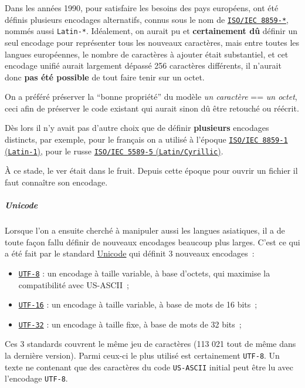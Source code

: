     Dans les années 1990, pour satisfaire les besoins des pays européens,
ont été définis plusieurs encodages alternatifs, connus sous le nom de
\href{http://en.wikipedia.org/wiki/ISO/IEC_8859}{\texttt{ISO/IEC\ 8859-*}},
nommés aussi \texttt{Latin-*}. Idéalement, on aurait pu et
\textbf{certainement dû} définir un seul encodage pour représenter tous
les nouveaux caractères, mais entre toutes les langues européennes, le
nombre de caractères à ajouter était substantiel, et cet encodage unifié
aurait largement dépassé 256 caractères différents, il n'aurait donc
\textbf{pas été possible} de tout faire tenir sur un octet.

On a préféré préserver la ``bonne propriété'' du modèle \emph{un
caractère} == \emph{un octet}, ceci afin de préserver le code existant
qui aurait sinon dû être retouché ou réécrit.

Dès lors il n'y avait pas d'autre choix que de définir
\textbf{plusieurs} encodages distincts, par exemple, pour le français on
a utilisé à l'époque
\href{http://en.wikipedia.org/wiki/ISO/IEC_8859-1}{\texttt{ISO/IEC\ 8859-1}
(\texttt{Latin-1})}, pour le russe
\href{http://en.wikipedia.org/wiki/ISO/IEC_8859-5}{\texttt{ISO/IEC\ 5589-5}
(\texttt{Latin/Cyrillic})}.

À ce stade, le ver était dans le fruit. Depuis cette époque pour ouvrir
un fichier il faut connaître son encodage.

    \hypertarget{unicode}{%
\subparagraph{Unicode}\label{unicode}}

    Lorsque l'on a ensuite cherché à manipuler aussi les langues asiatiques,
il a de toute façon fallu définir de nouveaux encodages beaucoup plus
larges. C'est ce qui a été fait par le standard
\href{http://en.wikipedia.org/wiki/Unicode}{Unicode} qui définit 3
nouveaux encodages~:

\begin{itemize}
\tightlist
\item
  \href{http://en.wikipedia.org/wiki/UTF-8}{\texttt{UTF-8}} : un
  encodage à taille variable, à base d'octets, qui maximise la
  compatibilité avec US-ASCII~;
\item
  \href{http://en.wikipedia.org/wiki/UTF-16}{\texttt{UTF-16}} : un
  encodage à taille variable, à base de mots de 16 bits~;
\item
  \href{http://en.wikipedia.org/wiki/UTF-32}{\texttt{UTF-32}} : un
  encodage à taille fixe, à base de mots de 32 bits~;
\end{itemize}

Ces 3 standards couvrent le même jeu de caractères (113 021 tout de même
dans la dernière version). Parmi ceux-ci le plus utilisé est
certainement \texttt{UTF-8}. Un texte ne contenant que des caractères du
code \texttt{US-ASCII} initial peut être lu avec l'encodage
\texttt{UTF-8}.

